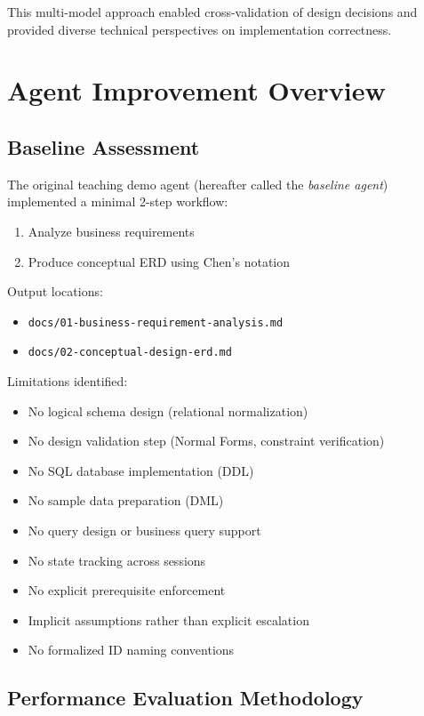 \documentclass[12pt,a4paper]{article}
\begin{document}
This multi-model approach enabled cross-validation of design decisions and provided diverse technical perspectives on implementation correctness.

\section{Agent Improvement Overview}

\subsection{Baseline Assessment}

The original teaching demo agent (hereafter called the \textit{baseline agent}) implemented a minimal 2-step workflow:

\begin{enumerate}
    \item Analyze business requirements
    \item Produce conceptual ERD using Chen's notation
\end{enumerate}

\noindent Output locations:
\begin{itemize}
    \item \texttt{docs/01-business-requirement-analysis.md}
    \item \texttt{docs/02-conceptual-design-erd.md}
\end{itemize}

\noindent Limitations identified:
\begin{itemize}
    \item No logical schema design (relational normalization)
    \item No design validation step (Normal Forms, constraint verification)
    \item No SQL database implementation (DDL)
    \item No sample data preparation (DML)
    \item No query design or business query support
    \item No state tracking across sessions
    \item No explicit prerequisite enforcement
    \item Implicit assumptions rather than explicit escalation
    \item No formalized ID naming conventions
\end{itemize}

\subsection{Performance Evaluation Methodology}
\end{document}
